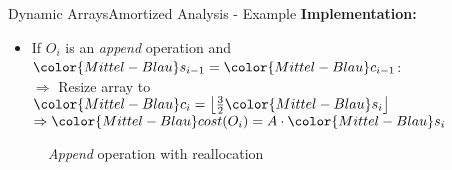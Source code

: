 \begin{frame}{Dynamic Arrays}{Amortized Analysis - Example}
  \textbf{Implementation:}
  \begin{itemize}
    \item
      If {\color{Mittel-Blau}$O_i$} is an \textit{append} operation and
      ${\color{Mittel-Blau}s_{i-1}} = {\color{Mittel-Blau}c_{i-1}}$:\\
      $\Rightarrow$ Resize array to
      ${\color{Mittel-Blau}c_i}
        = \left\lfloor\frac{3}{2} {\color{Mittel-Blau}s_i} \right\rfloor$\\
      $\Rightarrow {\color{Mittel-Blau}cost(O_i)}
        = A \cdot {\color{Mittel-Blau}s_i}$
  \end{itemize}
  \begin{figure}[!h]
    \def\FSAsize{7}\def\FSAelements{7}%
    \def\FSAcopy{0}\def\FSAdelete{0}\def\FSAinsert{0}%
    \def\FSAcopyarrow{0}%
    \def\FSAlabelsize{${\color{Mittel-Blau}s_{i-1}} = 7$}%
    \def\FSAlabelcapacity{%
      ${\color{Mittel-Blau}c_{i-1}}%
        = {\color{Mittel-Blau}s_{i-1}} = 7$}%
    \hspace*{0.5em}\raisebox{2em}{$\Rightarrow$}\hspace*{0.5em}%
    \def\FSAsize{13}\def\FSAelements{0}%
    \def\FSAcopy{8}\def\FSAdelete{0}\def\FSAinsert{1}%
    \def\FSAlabelsize{${\color{Mittel-Blau}s_i}
      = {\color{Mittel-Blau}s_{i-1}} + 1$}%
    \def\FSAlabelcapacity{${\color{Mittel-Blau}c_i}
      = \frac{3}{2}{\color{Mittel-Blau}s_i}$ = 13}%
    \caption{\textit{Append} operation with reallocation}
    \label{fig:dynamic_fields:amortized_analysis:append}
  \end{figure}
\end{frame}


